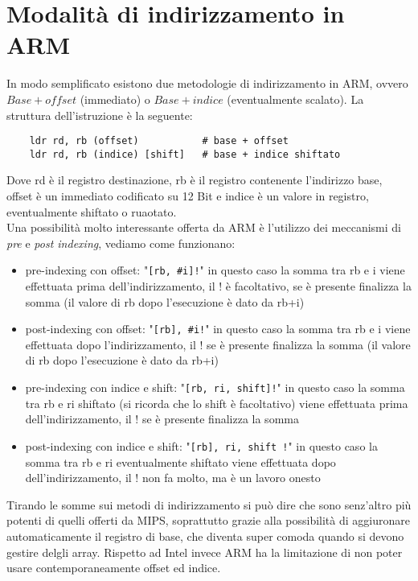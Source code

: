\documentclass[class=book, crop=false, oneside]{standalone}
\begin{document}
\section{Modalità di indirizzamento in ARM}
In modo semplificato esistono due metodologie di indirizzamento in ARM, ovvero $Base + offset$ (immediato) o $Base + indice$ (eventualmente scalato). La struttura dell'istruzione è la seguente:

\begin{verbatim}
	ldr rd, rb (offset)           # base + offset
	ldr rd, rb (indice) [shift]   # base + indice shiftato
\end{verbatim}

Dove rd è il registro destinazione, rb è il registro contenente l'indirizzo base, offset è un immediato codificato su 12 Bit e indice è un valore in registro, eventualmente shiftato o ruaotato.\\
Una possibilità molto interessante offerta da ARM è l'utilizzo dei meccanismi di \emph{pre} e \emph{post indexing}, vediamo come funzionano:

\begin{itemize}
	\item pre-indexing con offset: "\texttt{[rb, \#i]!}" in questo caso la somma tra rb e i viene  effettuata prima dell'indirizzamento, il ! è facoltativo, se è presente finalizza la somma (il valore di rb dopo l'esecuzione è dato da rb+i)
	\item post-indexing con offset: "\texttt{[rb], \#i!}" in questo caso la somma tra rb e i viene  effettuata dopo l'indirizzamento, il ! se è presente finalizza la somma (il valore di rb dopo l'esecuzione è dato da rb+i)
	\item pre-indexing con indice e shift: "\texttt{[rb, ri, shift]!}" in questo caso la somma tra rb e ri shiftato (si ricorda che lo shift è facoltativo) viene  effettuata prima dell'indirizzamento, il ! se è presente finalizza la somma
	\item post-indexing con indice e shift: "\texttt{[rb], ri, shift !}" in questo caso la somma tra rb e ri eventualmente shiftato viene  effettuata dopo dell'indirizzamento, il ! non fa molto, ma è un lavoro onesto
\end{itemize}

Tirando le somme sui metodi di indirizzamento si può dire che sono senz'altro più potenti di quelli offerti da MIPS, soprattutto grazie alla possibilità di aggiuronare automaticamente il registro di base, che diventa super comoda quando si devono gestire delgli array. Rispetto ad Intel invece ARM ha la limitazione di non poter usare contemporaneamente offset ed indice.

\end{document}
